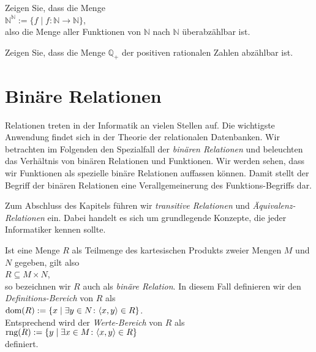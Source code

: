 \exercise
Zeigen Sie, dass die Menge
\\[0.2cm]
\hspace*{1.3cm}
$\mathbb{N}^\mathbb{N} := \{ f \mid f: \mathbb{N} \rightarrow \mathbb{N} \}$,
\\[0.2cm]
also die Menge aller Funktionen von $\mathbb{N}$ nach $\mathbb{N}$ \"{u}berabz\"{a}hlbar ist.
\exend

\exercise
Zeigen Sie, dass die Menge $\mathbb{Q}_+$ der positiven rationalen Zahlen abz\"{a}hlbar ist.
\exend


\section{Bin\"{a}re Relationen}
Relationen treten in der Informatik an vielen Stellen auf.  Die wichtigste
Anwendung findet sich in der Theorie der relationalen Datenbanken.
Wir betrachten im Folgenden den Spezialfall der \emph{bin\"{a}ren Relationen} und beleuchten
das Verh\"{a}ltnis von bin\"{a}ren Relationen und Funktionen. Wir werden sehen, dass wir
Funktionen als spezielle bin\"{a}re Relationen auffassen k\"{o}nnen.  Damit stellt der Begriff der
bin\"{a}ren Relationen eine Verallgemeinerung des Funktions-Begriffs dar.

Zum Abschluss des Kapitels f\"{u}hren wir \emph{transitive Relationen} und
\emph{\"{A}quivalenz-Relationen} ein.  Dabei handelt es sich um grundlegende Konzepte, die jeder Informatiker
kennen sollte.

Ist eine Menge $R$ als Teilmenge des kartesischen Produkts zweier Mengen $M$ und $N$ gegeben, gilt
also \\[0.2cm]
\hspace*{1.3cm} $R \subseteq M \times N$, \\[0.2cm]
so bezeichnen wir $R$ auch als \emph{bin\"{a}re Relation}.  In diesem Fall definieren wir den
\emph{Definitions-Bereich} von $R$ als \\[0.2cm]
\hspace*{1.3cm} $\textrm{dom}(R) := \{ x \mid \exists y \in N \colon \langle x, y \rangle \in R \}$.  
\\[0.2cm]
Entsprechend wird der \emph{Werte-Bereich} von $R$ als \\[0.2cm]
\hspace*{1.3cm} $\textrm{rng}(R) := \{ y \mid \exists x \in M \colon \langle x, y \rangle \in R\}$ \\[0.2cm]
definiert.  

